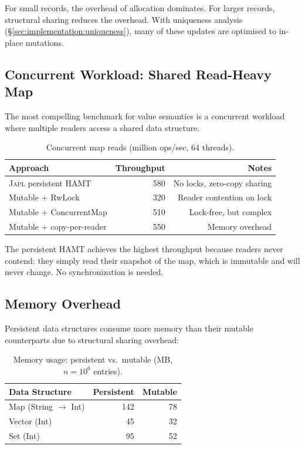 \documentclass[11pt]{article}
\theoremstyle{definition}
\theoremstyle{remark}
\newcommand{\japl}{\textsc{Japl}}
\begin{document}
For small records, the overhead of allocation dominates.  For larger
records, structural sharing reduces the overhead.  With uniqueness
analysis (\S\ref{sec:implementation:uniqueness}), many of these
updates are optimised to in-place mutations.

\subsection{Concurrent Workload: Shared Read-Heavy Map}

The most compelling benchmark for value semantics is a concurrent
workload where multiple readers access a shared data structure.

\begin{table}[H]
\centering
\caption{Concurrent map reads (million ops/sec, 64 threads).}
\label{tab:concurrent-benchmark}
\begin{tabular}{lrr}
\toprule
\textbf{Approach} & \textbf{Throughput} & \textbf{Notes} \\
\midrule
\japl{} persistent HAMT  & 580 & No locks, zero-copy sharing \\
Mutable + RwLock         & 320 & Reader contention on lock \\
Mutable + ConcurrentMap  & 510 & Lock-free, but complex \\
Mutable + copy-per-reader & 550 & Memory overhead \\
\bottomrule
\end{tabular}
\end{table}

The persistent HAMT achieves the highest throughput because readers
never contend: they simply read their snapshot of the map, which is
immutable and will never change.  No synchronization is needed.

\subsection{Memory Overhead}

Persistent data structures consume more memory than their mutable
counterparts due to structural sharing overhead:

\begin{table}[H]
\centering
\caption{Memory usage: persistent vs.\ mutable (MB, $n = 10^6$ entries).}
\label{tab:memory-benchmark}
\begin{tabular}{lrr}
\toprule
\textbf{Data Structure} & \textbf{Persistent} & \textbf{Mutable} \\
\midrule
Map (String $\to$ Int)     & 142 & 78 \\
Vector (Int)               & 45  & 32 \\
Set (Int)                  & 95  & 52 \\
\bottomrule
\end{tabular}
\end{table}
\end{document}
